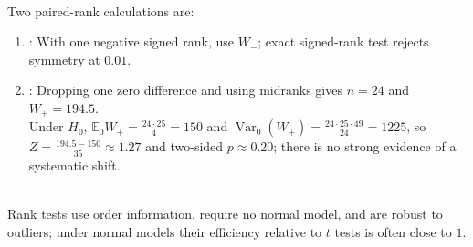 \begin{example} \label{ex:signed-rank-paired-examples} \\
Two paired-rank calculations are:
\begin{enumerate}[label=(\roman*)]
\setlength{\itemsep}{0pt}
\item {}: With one negative signed rank, use $W_-$; exact signed-rank test rejects symmetry at $0.01$.
\item {}: Dropping one zero difference and using midranks gives $n=24$ and $W_+=194.5$.\\
Under $H_0$, $\mathbb{E}_0W_+=\frac{24\cdot25}{4}=150$ and $\operatorname{Var}_0(W_+)=\frac{24\cdot25\cdot49}{24}=1225$, so $Z=\frac{194.5-150}{35}\approx1.27$ and two-sided $p\approx0.20$; there is no strong evidence of a systematic shift.
\end{enumerate}
\end{example}

\begin{remark} \label{rem:rank-tests-versus-normal-theory} \\
Rank tests use order information, require no normal model, and are robust to outliers; under normal models their efficiency relative to $t$ tests is often close to $1$.
\end{remark}
